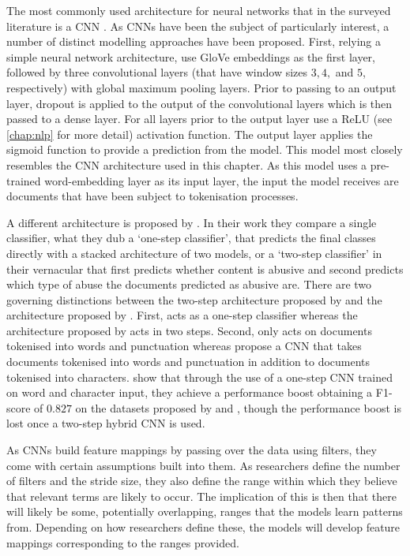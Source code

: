 The most commonly used architecture for neural networks that in the surveyed literature is a CNN \citep{Park:2017,Gamback:2017,Wulczyn:2017,Kolhatkar:2021,Zimmerman:2018,Wang:2020}. As CNNs have been the subject of particularly interest, a number of distinct modelling approaches have been proposed. First, relying a simple neural network architecture, \citet{Kolhatkar:2021} use GloVe embeddings as the first layer, followed by three convolutional layers (that have window sizes $3, 4,$ and $5$, respectively) with global maximum pooling layers. Prior to passing to an output layer, dropout is applied to the output of the convolutional layers which is then passed to a dense layer. For all layers prior to the output layer use a ReLU (see \cref{chap:nlp} for more detail) activation function. The output layer applies the sigmoid function to provide a prediction from the model. This model most closely resembles the CNN architecture used in this chapter. As this model uses a pre-trained word-embedding layer as its input layer, the input the model receives are documents that have been subject to tokenisation processes.

A different architecture is proposed by \citet{Park:2017}. In their work they compare a single classifier, what they dub a `one-step classifier', that predicts the final classes directly with a stacked architecture of two models, or a `two-step classifier' in their vernacular that first predicts whether content is abusive and second predicts which type of abuse the documents predicted as abusive are. There are two governing distinctions between the two-step architecture proposed by \citet{Park:2017} and the architecture proposed by \citet{Kolhatkar:2021}. First, \citet{Kolhatkar:2021} acts as a one-step classifier whereas the architecture proposed by \citet{Park:2017} acts in two steps. Second, \citet{Kolhatkar:2021} only acts on documents tokenised into words and punctuation whereas \citet{Park:2017} propose a CNN that takes documents tokenised into words and punctuation in addition to documents tokenised into characters. \citet{Park:2017} show that through the use of a one-step CNN trained on word and character input, they achieve a performance boost obtaining a F1-score of $0.827$ on the datasets proposed by \citet{Waseem-Hovy:2016} and \citet{Waseem:2016}, though the performance boost is lost once a two-step hybrid CNN is used.

As CNNs build feature mappings by passing over the data using filters, they come with certain assumptions built into them. As researchers define the number of filters and the stride size, they also define the range within which they believe that relevant terms are likely to occur. The implication of this is then that there will likely be some, potentially overlapping, ranges that the models learn patterns from. Depending on how researchers define these, the models will develop feature mappings corresponding to the ranges provided.

